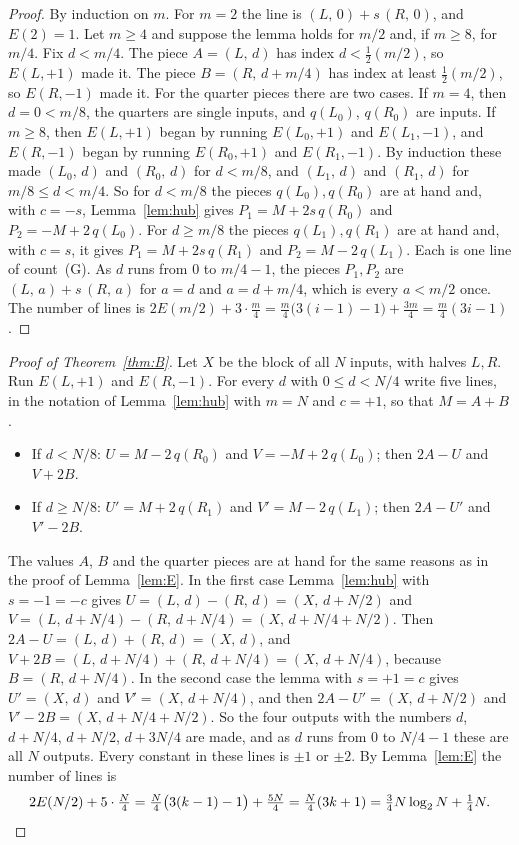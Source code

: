 \documentclass[10pt]{article}
\theoremstyle{remark}
\newcommand{\cntG}{\textup{(G)}}
\renewcommand{\lg}{\log_2}
\newcommand{\pc}[2]{(#1,\,#2)}
\begin{document}
\begin{proof}
By induction on $m$. For $m=2$ the line is $\pc L0+s\,\pc R0$, and $E(2)=1$. Let $m\ge4$ and suppose the
lemma holds for $m/2$ and, if $m\ge 8$, for $m/4$. Fix $d<m/4$. The piece $A=\pc Ld$ has index
$d<\tfrac12(m/2)$, so $E(L,+1)$ made it. The piece $B=\pc R{d+m/4}$ has index at least $\tfrac12(m/2)$, so
$E(R,-1)$ made it. For the quarter pieces there are two cases. If $m=4$, then $d=0<m/8$, the quarters are
single inputs, and $q(L_0)$, $q(R_0)$ are inputs. If $m\ge8$, then $E(L,+1)$ began by running $E(L_0,+1)$
and $E(L_1,-1)$, and $E(R,-1)$ began by running $E(R_0,+1)$ and $E(R_1,-1)$. By induction these made
$\pc{L_0}d$ and $\pc{R_0}d$ for $d<m/8$, and $\pc{L_1}d$ and $\pc{R_1}d$ for $m/8\le d<m/4$. So for $d<m/8$ the
pieces $q(L_0),q(R_0)$ are at hand and, with $c=-s$, Lemma~\ref{lem:hub} gives $P_1=M+2s\,q(R_0)$ and
$P_2=-M+2\,q(L_0)$. For $d\ge m/8$ the pieces $q(L_1),q(R_1)$ are at hand and, with $c=s$, it gives
$P_1=M+2s\,q(R_1)$ and $P_2=M-2\,q(L_1)$. Each is one line of count~\cntG. As $d$ runs from $0$ to $m/4-1$, the
pieces $P_1,P_2$ are $\pc La+s\,\pc Ra$ for $a=d$ and $a=d+m/4$, which is every $a<m/2$ once.
The number of lines is $2E(m/2)+3\cdot\tfrac m4=\tfrac m4\bigl(3(i-1)-1\bigr)+\tfrac{3m}4=\tfrac m4(3i-1)$.
\end{proof}

\begin{proof}[Proof of Theorem~\ref{thm:B}]
Let $X$ be the block of all $N$ inputs, with halves $L,R$. Run $E(L,+1)$ and $E(R,-1)$. For every $d$ with
$0\le d<N/4$ write five lines, in the notation of Lemma~\ref{lem:hub} with $m=N$ and $c=+1$, so that $M=A+B$.
\begin{itemize}\setlength{\itemsep}{1pt}\setlength{\parskip}{0pt}
\item If $d<N/8$: $U=M-2\,q(R_0)$ and $V=-M+2\,q(L_0)$; then $2A-U$ and $V+2B$.
\item If $d\ge N/8$: $U'=M+2\,q(R_1)$ and $V'=M-2\,q(L_1)$; then $2A-U'$ and $V'-2B$.
\end{itemize}
The values $A$, $B$ and the quarter pieces are at hand for the same reasons as in the proof of
Lemma~\ref{lem:E}. In the first case Lemma~\ref{lem:hub} with $s=-1=-c$ gives $U=\pc Ld-\pc Rd=\pc X{d+N/2}$
and $V=\pc L{d+N/4}-\pc R{d+N/4}=\pc X{d+N/4+N/2}$. Then $2A-U=\pc Ld+\pc Rd=\pc Xd$, and
$V+2B=\pc L{d+N/4}+\pc R{d+N/4}=\pc X{d+N/4}$, because $B=\pc R{d+N/4}$. In the second case the lemma with
$s=+1=c$ gives $U'=\pc Xd$ and $V'=\pc X{d+N/4}$, and then $2A-U'=\pc X{d+N/2}$ and $V'-2B=\pc X{d+N/4+N/2}$.
So the four outputs with the numbers $d$, $d+N/4$, $d+N/2$, $d+3N/4$ are made, and as $d$ runs from $0$ to
$N/4-1$ these are all $N$ outputs. Every constant in these lines is $\pm1$ or $\pm2$. By Lemma~\ref{lem:E} the
number of lines is
\[
2E(N/2)+5\cdot\tfrac N4=\tfrac N4\bigl(3(k-1)-1\bigr)+\tfrac{5N}4=\tfrac N4(3k+1)=\tfrac34N\lg N+\tfrac14N .
\qedhere
\]
\end{proof}
\end{document}
